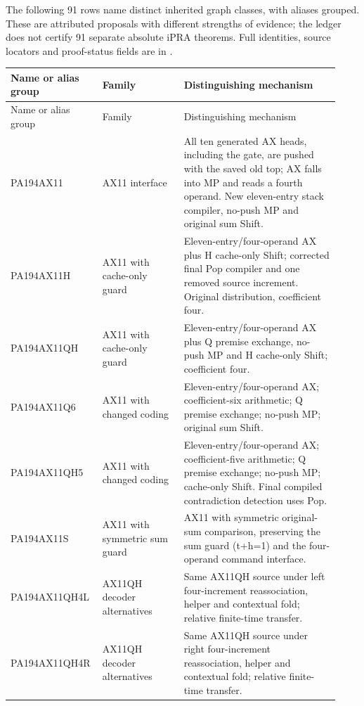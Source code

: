 The following 91 rows name distinct inherited graph classes, with aliases grouped. These are attributed proposals with different strengths of evidence; the ledger does not certify 91 separate absolute iPRA theorems. Full identities, source locators and proof-status fields are in .
\begingroup\small\setlength{\tabcolsep}{3pt}
\begin{longtable}{>{\raggedright\arraybackslash}p{0.23\linewidth}>{\raggedright\arraybackslash}p{0.24\linewidth}>{\raggedright\arraybackslash}p{0.46\linewidth}}
\toprule Name or alias group&Family&Distinguishing mechanism\\\midrule\endfirsthead
\toprule Name or alias group&Family&Distinguishing mechanism\\\midrule\endhead
\bottomrule\endfoot
PA194AX11&AX11 interface&All ten generated AX heads, including the gate, are pushed with the saved old top; AX falls into MP and reads a fourth operand. New eleven-entry stack compiler, no-push MP and original sum Shift.\\[5pt]
PA194AX11H&AX11 with cache-only guard&Eleven-entry/\allowbreak{}four-operand AX plus H cache-only Shift; corrected final Pop compiler and one removed source increment. Original distribution, coefficient four.\\[5pt]
PA194AX11QH&AX11 with cache-only guard&Eleven-entry/\allowbreak{}four-operand AX plus Q premise exchange, no-push MP and H cache-only Shift; coefficient four.\\[5pt]
PA194AX11Q6&AX11 with changed coding&Eleven-entry/\allowbreak{}four-operand AX; coefficient-six arithmetic; Q premise exchange; no-push MP; original sum Shift.\\[5pt]
PA194AX11QH5&AX11 with changed coding&Eleven-entry/\allowbreak{}four-operand AX; coefficient-five arithmetic; Q premise exchange; no-push MP; cache-only Shift. Final compiled contradiction detection uses Pop.\\[5pt]
PA194AX11S&AX11 with symmetric sum guard&AX11 with symmetric original-sum comparison, preserving the sum guard (t+h=1) and the four-operand command interface.\\[5pt]
PA194AX11QH4L&AX11QH decoder alternatives&Same AX11QH source under left four-increment reassociation, helper and contextual fold; relative finite-time transfer.\\[5pt]
PA194AX11QH4R&AX11QH decoder alternatives&Same AX11QH source under right four-increment reassociation, helper and contextual fold; relative finite-time transfer.\\[5pt]

\end{longtable}
